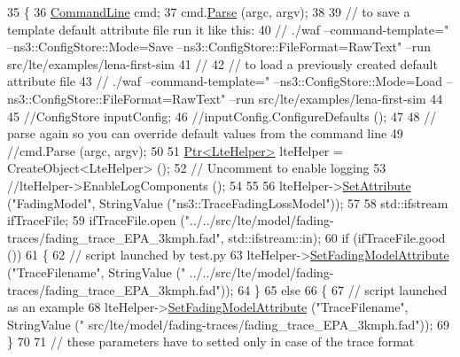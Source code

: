 \begin{DoxyCode}
35 \{       
36   \hyperlink{classns3_1_1CommandLine}{CommandLine} cmd;
37   cmd.\hyperlink{classns3_1_1CommandLine_a5c10b85b3207e5ecb48d907966923156}{Parse} (argc, argv);
38         
39   \textcolor{comment}{// to save a template default attribute file run it like this:}
40   \textcolor{comment}{// ./waf --command-template="%
       --ns3::ConfigStore::Mode=Save --ns3::ConfigStore::FileFormat=RawText" --run src/lte/examples/lena-first-sim}
41   \textcolor{comment}{//}
42   \textcolor{comment}{// to load a previously created default attribute file}
43   \textcolor{comment}{// ./waf --command-template="%
       --ns3::ConfigStore::Mode=Load --ns3::ConfigStore::FileFormat=RawText" --run src/lte/examples/lena-first-sim}
44 
45   \textcolor{comment}{//ConfigStore inputConfig;}
46   \textcolor{comment}{//inputConfig.ConfigureDefaults ();}
47 
48   \textcolor{comment}{// parse again so you can override default values from the command line}
49   \textcolor{comment}{//cmd.Parse (argc, argv);}
50 
51   \hyperlink{classns3_1_1Ptr}{Ptr<LteHelper>} lteHelper = CreateObject<LteHelper> ();
52   \textcolor{comment}{// Uncomment to enable logging}
53   \textcolor{comment}{//lteHelper->EnableLogComponents ();}
54   
55 
56   lteHelper->\hyperlink{classns3_1_1ObjectBase_ac60245d3ea4123bbc9b1d391f1f6592f}{SetAttribute} (\textcolor{stringliteral}{"FadingModel"}, StringValue (\textcolor{stringliteral}{"ns3::TraceFadingLossModel"}));
57   
58   std::ifstream ifTraceFile;
59   ifTraceFile.open (\textcolor{stringliteral}{"../../src/lte/model/fading-traces/fading\_trace\_EPA\_3kmph.fad"}, std::ifstream::in);
60   \textcolor{keywordflow}{if} (ifTraceFile.good ())
61     \{
62       \textcolor{comment}{// script launched by test.py}
63       lteHelper->\hyperlink{classns3_1_1LteHelper_aedbe5aa68544779474f27d32e4470ada}{SetFadingModelAttribute} (\textcolor{stringliteral}{"TraceFilename"}, StringValue (\textcolor{stringliteral}{"
      ../../src/lte/model/fading-traces/fading\_trace\_EPA\_3kmph.fad"}));
64     \}
65   \textcolor{keywordflow}{else}
66     \{
67       \textcolor{comment}{// script launched as an example}
68       lteHelper->\hyperlink{classns3_1_1LteHelper_aedbe5aa68544779474f27d32e4470ada}{SetFadingModelAttribute} (\textcolor{stringliteral}{"TraceFilename"}, StringValue (\textcolor{stringliteral}{"
      src/lte/model/fading-traces/fading\_trace\_EPA\_3kmph.fad"}));
69     \}
70     
71   \textcolor{comment}{// these parameters have to setted only in case of the trace format }

\end{DoxyCode}
